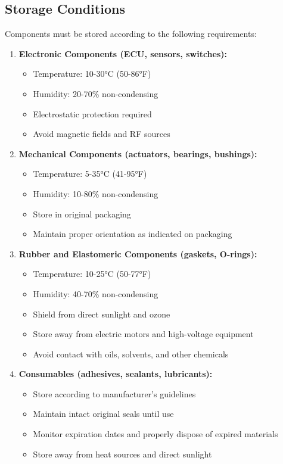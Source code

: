 \documentclass[12pt,a4paper,twoside,openright]{book}
\begin{document}
\subsection{Storage Conditions}

Components must be stored according to the following requirements:

\begin{enumerate}
    \item \textbf{Electronic Components (ECU, sensors, switches):}
    \begin{itemize}
        \item Temperature: 10-30°C (50-86°F)
        \item Humidity: 20-70\% non-condensing
        \item Electrostatic protection required
        \item Avoid magnetic fields and RF sources
    \end{itemize}
    
    \item \textbf{Mechanical Components (actuators, bearings, bushings):}
    \begin{itemize}
        \item Temperature: 5-35°C (41-95°F)
        \item Humidity: 10-80\% non-condensing
        \item Store in original packaging
        \item Maintain proper orientation as indicated on packaging
    \end{itemize}
    
    \item \textbf{Rubber and Elastomeric Components (gaskets, O-rings):}
    \begin{itemize}
        \item Temperature: 10-25°C (50-77°F)
        \item Humidity: 40-70\% non-condensing
        \item Shield from direct sunlight and ozone
        \item Store away from electric motors and high-voltage equipment
        \item Avoid contact with oils, solvents, and other chemicals
    \end{itemize}
    
    \item \textbf{Consumables (adhesives, sealants, lubricants):}
    \begin{itemize}
        \item Store according to manufacturer's guidelines
        \item Maintain intact original seals until use
        \item Monitor expiration dates and properly dispose of expired materials
        \item Store away from heat sources and direct sunlight
    \end{itemize}
\end{enumerate}
\end{document}
